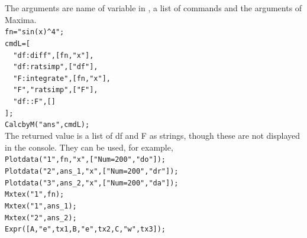 \documentclass[papersize,a4paper,12pt]{article}
\begin{document}
The arguments are name of variable in \ketcindy, a list of commands and the arguments of Maxima.\\
\hspace*{10mm}\verb|fn="sin(x)^4";|\\
\hspace*{10mm}\verb|cmdL=[|\\
\hspace*{10mm}\verb|  "df:diff",[fn,"x"],|\\
\hspace*{10mm}\verb|  "df:ratsimp",["df"],|\\
\hspace*{10mm}\verb|  "F:integrate",[fn,"x"],|\\
\hspace*{10mm}\verb|  "F","ratsimp",["F"],|\\
\hspace*{10mm}\verb|  "df::F",[]|\\
\hspace*{10mm}\verb|];|\\
\hspace*{10mm}\verb|CalcbyM("ans",cmdL);|\vspace{2mm}\\
The returned value is a list of df and F as strings, though these are not displayed in the console. They can be used, for example,\vspace{2mm}\\
\hspace*{10mm}\verb|Plotdata("1",fn,"x",["Num=200","do"]);|\\
\hspace*{10mm}\verb|Plotdata("2",ans_1,"x",["Num=200","dr"]);|\\
\hspace*{10mm}\verb|Plotdata("3",ans_2,"x",["Num=200","da"]);|\\
\hspace*{10mm}\verb|Mxtex("1",fn);|\\
\hspace*{10mm}\verb|Mxtex("1",ans_1);|\\
\hspace*{10mm}\verb|Mxtex("2",ans_2);|\\
\hspace*{10mm}\verb|Expr([A,"e",tx1,B,"e",tx2,C,"w",tx3]);|

\vspace{2mm}

\begin{center}

\end{center}
\end{document}
